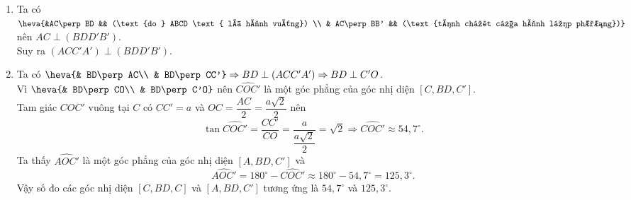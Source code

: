 \begin{bt}
{\begin{enumerate}
			\item Ta có $\heva{&AC\perp BD && (\text{do } ABCD \text{ là hình vuông}) \\
				& AC\perp BB' && (\text{tính chất của hình lập phương})}$ nên $AC\perp (BDD'B')$.\\
			Suy ra $(ACC'A') \perp(BDD'B')$.
			\item Ta có $\heva{& BD\perp AC\\ & BD\perp CC'}\Rightarrow BD\perp (ACC'A')\Rightarrow BD\perp C'O$.\\
			Vì $\heva{& BD\perp CO\\ & BD\perp C'O}$ nên $\widehat{COC'}$ là một góc phẳng của góc nhị diện $[C,BD, C']$.\\
			Tam giác $COC'$ vuông tại $C$ có $CC'=a$ và $OC=\dfrac{AC}{2}=\dfrac{a\sqrt{2}}{2}$ nên 
			$$\tan\widehat{COC'}=\dfrac{CC'}{CO}=\dfrac{a}{\dfrac{a\sqrt{2}}{2}}=\sqrt{2}\Rightarrow \widehat{COC'}\approx 54{,}7^\circ.$$
			Ta thấy $\widehat{AOC'}$ là một góc phẳng của góc nhị diện $[A,BD, C']$ và 
			$$\widehat{AOC'}=180^\circ-\widehat{COC'}\approx 180^\circ-54{,}7^\circ=125{,}3^\circ.$$
			Vậy số đo các góc nhị diện $[C,BD,C]$ và $[A,BD,C']$ tương ứng là $54{,}7^\circ$ và $125{,}3^\circ$.
		\end{enumerate}
	} 
\end{bt}

